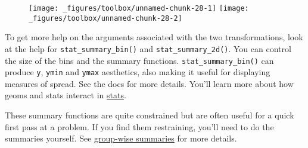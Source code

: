 \begin{Shaded}
\begin{Highlighting}[]
\StringTok{ }
\StringTok{  }\NormalTok{(} \NormalTok{, } \NormalTok{) +}\StringTok{ }
\StringTok{  }\NormalTok{(}\NormalTok{, }\NormalTok{) +}\StringTok{ }
\StringTok{  }\NormalTok{(}\NormalTok{, }\NormalTok{)}

 \StringTok{ }
\StringTok{  }\NormalTok{(} \NormalTok{, } \NormalTok{, } 
     \NormalTok{) +}\StringTok{ }
\StringTok{  }\NormalTok{(}\NormalTok{, }\NormalTok{) +}\StringTok{ }
\StringTok{  }\NormalTok{(}\NormalTok{, }\NormalTok{)}
\end{Highlighting}
\end{Shaded}

\begin{figure}[H]
  \texttt{[image: \_figures/toolbox/unnamed-chunk-28-1]}%
  \texttt{[image: \_figures/toolbox/unnamed-chunk-28-2]}
\end{figure}

To get more help on the arguments associated with the two
transformations, look at the help for \texttt{stat\_summary\_bin()} and
\texttt{stat\_summary\_2d()}. You can control the size of the bins and
the summary functions. \texttt{stat\_summary\_bin()} can produce
\texttt{y}, \texttt{ymin} and \texttt{ymax} aesthetics, also making it
useful for displaying measures of spread. See the docs for more details.
You'll learn more about how geoms and stats interact in
\hyperref[sec:stat]{stats}.

These summary functions are quite constrained but are often useful for a
quick first pass at a problem. If you find them restraining, you'll need
to do the summaries yourself. See \hyperref[sec:summarise]{group-wise
summaries} for more details.


